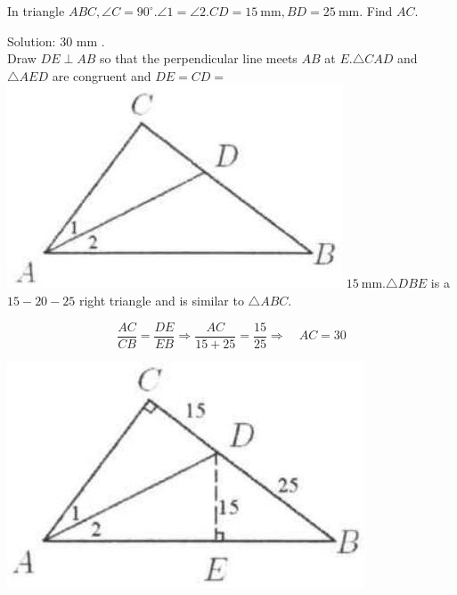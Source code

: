 \documentclass{article}
\begin{document}
In triangle \(A B C, \angle C=90^{\circ} . \angle 1=\angle 2 . C D=15 \mathrm{~mm}, B D=25 \mathrm{~mm}\). Find \(A C\).

Solution: 30 mm .\\
Draw \(D E \perp A B\) so that the perpendicular line meets \(A B\) at \(E . \triangle C A D\) and \(\triangle A E D\) are congruent and \(D E=C D=\)\\
\includegraphics[width=\textwidth]{images/055.jpg} \(15 \mathrm{~mm} . \triangle D B E\) is a \(15-20-25\) right triangle and is similar to \(\triangle A B C\).

\[
\frac{A C}{C B}=\frac{D E}{E B} \Rightarrow \frac{A C}{15+25}=\frac{15}{25} \Rightarrow \quad A C=30
\]

\begin{center}
\includegraphics[width=\textwidth]{images/055(3).jpg}
\end{center}
\end{document}
